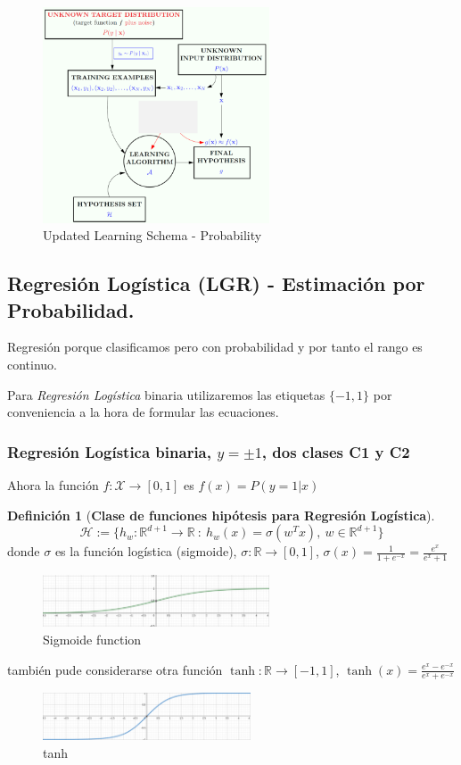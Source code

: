 \documentclass[11pt,a4paper]{article}
\theoremstyle{definition}
\newtheorem{definition}{Definición}[section]
\newcommand{\R}{\mathbb{R}}
\begin{document}
	\begin{figure}[H]
	\centering
	\includegraphics[width=0.6\textwidth]{images/updated_learning_P}
	\caption{Updated Learning Schema - Probability}
	\end{figure}
	
	\subsection{Regresión Logística (LGR) - Estimación por Probabilidad.}
	Regresión porque clasificamos pero con probabilidad y por tanto el rango es continuo.
	
	Para \textit{Regresión Logística} binaria utilizaremos las etiquetas $\{-1,1\}$ por conveniencia a la hora de formular las ecuaciones.
	\subsubsection{Regresión Logística binaria, $y=\pm 1$, dos clases C1 y C2}
	Ahora la función $f\colon \mathcal{X} \to [0,1]$ es $f(x)=P(y=1|x)$
	\begin{definition}[\bf Clase de funciones hipótesis para Regresión Logística]
	$$\mathcal{H}:=\{h_w\colon \R^{d+1}\to \R \ :\ h_w(x)=\sigma(w^Tx),\ w \in \R^{d+1}\}$$
	donde $\sigma$ es la función logística (sigmoide), $\sigma\colon \R \to [0,1]$, $\sigma(x)=\frac{1}{1+e^{-x}}=\frac{e^x}{e^x+1}$
	\begin{figure}[H]
	\centering
	\includegraphics[width=0.6\textwidth]{images/sigmoide}
	\caption{Sigmoide function}
	\end{figure}
	también pude considerarse otra función $\tanh \colon \R \to [-1,1]$, $\tanh(x)=\frac{e^x-e^{-x}}{e^x+e^{-x}}$
	\begin{figure}[H]
	\centering
	\includegraphics[width=0.55\textwidth]{images/tanh}
	\caption{tanh}
	\end{figure}
	\end{definition}
	
\end{document}
